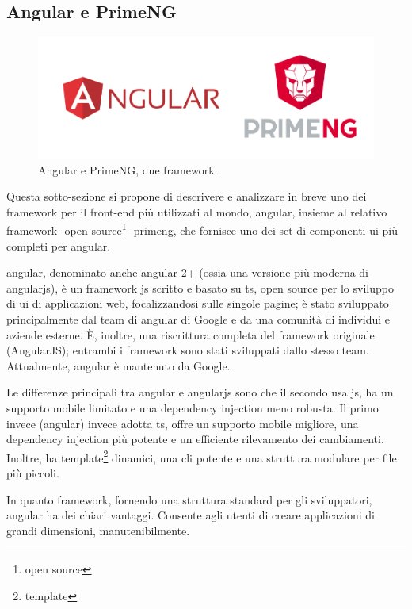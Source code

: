 \subsection{Angular e PrimeNG}\label{sec:ang+prime}
\begin{figure}[H]
\centering
\includegraphics[width=.5\textwidth]{Images/ang+prime.png}
\caption{\label{fig:ang+prime}Angular e PrimeNG, due \gls{framework}.}
\end{figure}
Questa sotto-sezione si propone di descrivere e analizzare in breve uno dei \gls{framework} per il front-end più utilizzati al mondo, \gls{angular}, insieme al relativo \gls{framework} -\gls{open source}\footnote{\glsdesc{open source}}- \acrshort{primeng}, che fornisce uno dei set di componenti \acrshort{ui} più completi per \gls{angular}.\newline

\gls{angular}, denominato anche \gls{angular} 2+ (ossia una versione più moderna di \gls{angularjs}), è un \gls{framework} \acrlong{js} scritto e basato su \acrlong{ts}, open source per lo sviluppo di \acrshort{ui} di applicazioni web, focalizzandosi sulle singole pagine; è stato sviluppato principalmente dal team di \gls{angular} di Google e da una comunità di individui e aziende esterne. È, inoltre, una riscrittura completa del \gls{framework} originale (AngularJS); entrambi i \gls{framework} sono stati sviluppati dallo stesso team. Attualmente, \gls{angular} è mantenuto da Google.

Le differenze principali tra \gls{angular} e \gls{angularjs} sono che il secondo usa \acrlong{js}, ha un supporto mobile limitato e una dependency injection meno robusta. Il primo invece (\gls{angular}) invece adotta \acrlong{ts}, offre un supporto mobile migliore, una dependency injection più potente e un efficiente rilevamento dei cambiamenti. Inoltre, ha template\footnote{\glsdesc{template}} dinamici, una \acrshort{cli} potente e una struttura modulare per file più piccoli.\newline

In quanto \gls{framework}, fornendo una struttura standard per gli sviluppatori, \gls{angular} ha dei chiari vantaggi. Consente agli utenti di creare applicazioni di grandi dimensioni, manutenibilmente.  

